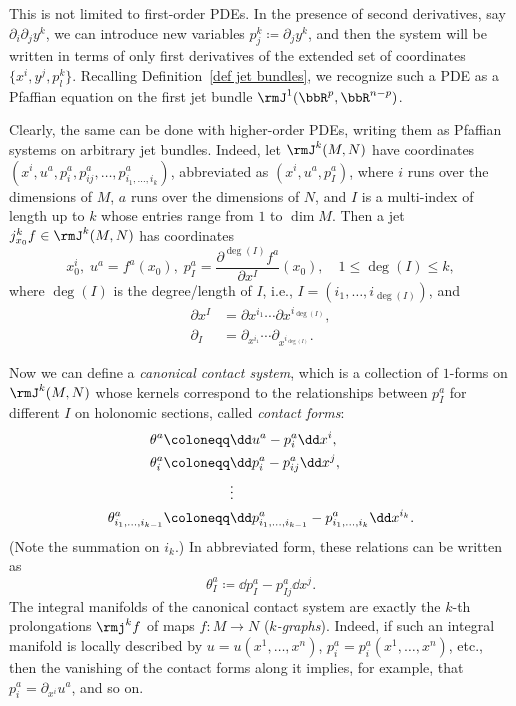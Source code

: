 \begin{rem}\label{rem canonical contact system}
    This is not limited to first-order PDEs. In the presence of second derivatives, say $\partial_i\partial_j y^k$, we can  introduce new variables $p_j^k\coloneqq \partial_j y^k$, and then the system will be written in terms of only first derivatives of the extended set of coordinates $\{x^i,y^j,p^k_l\}$. Recalling Definition~\ref{def jet bundles}, we recognize such a PDE as a Pfaffian equation on the first jet bundle $\rmJ^1(\bbR^p,\bbR^{n-p})$. 
    
    Clearly, the same can be done with higher-order PDEs, writing them as Pfaffian systems on arbitrary jet bundles. Indeed, let $\rmJ^k(M,N)$ have coordinates $(x^i,u^a,p_i^a,p_{ij}^a,\ldots,p_{i_1,\ldots,i_k}^a)$, abbreviated as $(x^i,u^a,p_I^a)$, where $i$ runs over the dimensions of $M$, $a$ runs over the dimensions of $N$, and $I$ is a multi-index  of length up to $k$ whose entries range from $1$ to $\dim M$. Then a jet $j_{x_0}^k f\in \rmJ^k(M,N)$ has coordinates 
    \[x^i_0,\; u^a=f^a(x_0),\; p_I^a=\frac{\partial^{\deg(I)}f^a}{\partial x^I}(x_0),\quad 1\leq \deg(I)\leq k,\]
    where $\deg(I)$ is the degree/length of $I$, i.e., $I=(i_1,\ldots,i_{\deg(I)})$, and 
    \begin{align}
        \partial x^I &=\partial x^{i_1}\cdots \partial x^{i_{\deg(I)}},\\
        \partial_I&= \partial_{x^{i_1}}\cdots \partial_{x^{i_{\deg(I)}}}.
    \end{align}
    
    Now we can define a \emph{canonical contact system}, which is a collection of $1$-forms on $\rmJ^k(M,N)$ whose kernels correspond to the relationships between $p_I^a$ for different $I$ on holonomic sections, called \emph{contact forms}:
    \begin{align}
        \theta^a\coloneqq &\dd u^a-p_i^a\dd x^i,\notag\\
        \theta^a_i\coloneqq& \dd p^a_i-p_{ij}^a\dd x^j,\notag\\
        &\vdots \\
        \theta^a_{i_1,\ldots,i_{k-1}}\coloneqq &\dd p^a_{i_1,\ldots,i_{k-1}}-p_{i_1,\ldots,i_k}^a\dd x^{i_k}.\notag
    \end{align}
    (Note the summation on $i_k$.) In abbreviated form, these relations can be written as 
    \[\theta^a_I\coloneqq \dd p_I^a-p^a_{Ij}\dd x^j.\]
    The integral manifolds of the canonical contact system are exactly the $k$-th prolongations $\rmj^k f$ of maps $f:M\to N$ (\emph{$k$-graphs}). Indeed, if such an integral manifold is locally described by $u=u(x^1,\ldots,x^n)$, $p_i^a=p_i^a(x^1,\ldots,x^n)$,  etc., then the vanishing of the contact forms along it implies, for example, that $p_i^a=\partial_{x^i}u^a$, and so on. 


\end{rem}
